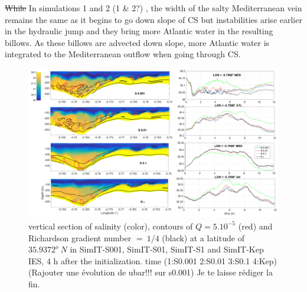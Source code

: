 \sout{While} \color{blue}In simulations 1 and 2 (\color{green}1 \& 2?) \color{blue}, the width of the salty Mediterranean vein remains the same as it begins to go down slope of CS but instabilities arise earlier in the hydraulic jump and they bring more Atlantic water in the resulting billows. As these billows are advected down slope, more Atlantic water is integrated to the Mediterranean outflow when going through CS. \color{black} 


\begin{figure}[!h]
 \includegraphics[width=\textwidth]{./GBR3D/Figsmago.png}
 \caption { \color{blue}vertical section of salinity (color), contours of $Q = 5.10^{-5}$ (red) and Richardson gradient number $=\ 1/4$ (black) at a latitude of $35.9372^o\ N$ in SimIT-S001, SimIT-S01, SimIT-S1 and SimIT-Kep IES, 4 h after the initialization.  \color{green}time  (1:S0.001  2:S0.01  3:S0.1 4:Kep)(Rajouter une évolution de ubar!!! sur s0.001) Je te laisse rédiger la fin. \color{black}}
 \label{Fig3Dsch}
\end{figure}

